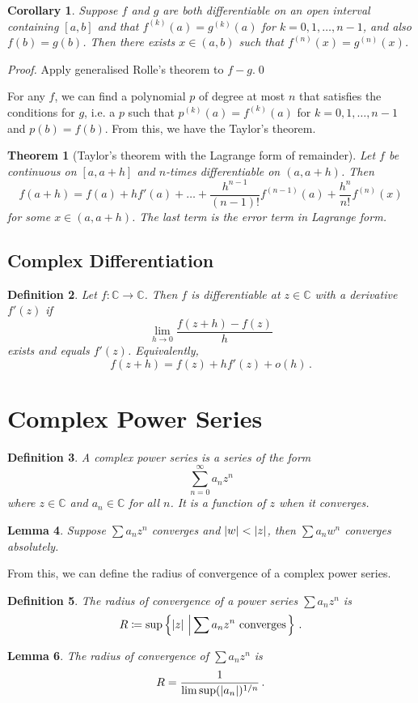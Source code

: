 \documentclass{article}
\theoremstyle{plain}\theoremheaderfont{\normalfont\itshape}\theorembodyfont{\rmfamily}\theoremseparator{.}\newtheorem*{rem}{Remark}\newtheorem*{ex}{Example}\newtheorem*{proof}{Proof}\newtheorem*{altp}{Alternative proof}
\theoremstyle{plain}\theoremheaderfont{\normalfont\bfseries}\theorembodyfont{\rmfamily}\theoremseparator{.}\newtheorem{thm}{Theorem}[section]\newtheorem{lem}[thm]{Lemma}\newtheorem{prop}[thm]{Proposition}\newtheorem*{cor}{Corollary}\newtheorem{defn}[thm]{Definition}\newtheorem{clm}[thm]{Claim}\newtheorem{clminproof}{Claim}
\theoremstyle{break}\theoremheaderfont{\normalfont\itshape}\theorembodyfont{\rmfamily}\theoremseparator{.\medskip}\newtheorem*{proofskip}{Proof}\newtheorem*{exs}{Examples}\newtheorem*{rems}{Remarks}
\theoremstyle{break}\theoremheaderfont{\normalfont\bfseries}\theorembodyfont{\rmfamily}\theoremseparator{.\medskip}\newtheorem{lemskip}[thm]{Lemma}\newtheorem{defnskip}[thm]{Definition}\newtheorem{propskip}[thm]{Proposition}\newtheorem{thmskip}[thm]{Theorem}
\newcommand{\qed}{\hfill\ensuremath{\Box}}
\begin{document}
    \begin{cor}
        Suppose \(f\) and \(g\) are both differentiable on an open interval containing \([a,b]\) and that \(f^{(k)}(a)=g^{(k)}(a)\) for \(k=0,1,\dots,n-1\), and also \(f(b)=g(b)\). Then there exists \(x\in(a,b)\) such that \(f^{(n)}(x)=g^{(n)}(x)\).
    \end{cor}
    \begin{proof}
        Apply generalised Rolle's theorem to \(f-g\).\qed
    \end{proof}
    For any \(f\), we can find a polynomial \(p\) of degree at most \(n\) that satisfies the conditions for \(g\), i.e. a \(p\) such that \(p^{(k)}(a)=f^{(k)}(a)\) for \(k=0,1,\dots,n-1\) and \(p(b)=f(b)\). From this, we have the Taylor's theorem.
    \begin{thm}[Taylor's theorem with the Lagrange form of remainder]
        Let \(f\) be continuous on \([a,a+h]\) and \(n\)-times differentiable on \((a,a+h)\). Then
        \[f(a+h)=f(a)+hf'(a)+\dots+\frac{h^{n-1}}{(n-1)!}f^{(n-1)}(a)+\frac{h^n}{n!}f^{(n)}(x)\]
        for some \(x\in(a,a+h)\). The last term is the error term in Lagrange form.
    \end{thm}
    \subsection{Complex Differentiation}
    \begin{defn}
        Let \(f:\mathbb{C}\to\mathbb{C}\). Then \(f\) is differentiable at \(z\in\mathbb{C}\) with a derivative \(f'(z)\) if
        \[\lim_{h\to 0}\frac{f(z+h)-f(z)}{h}\]
        exists and equals \(f'(z)\). Equivalently,
        \[f(z+h)=f(z)+hf'(z)+o(h)\,.\] 
    \end{defn}
    \section{Complex Power Series}
    \begin{defn}
        A \textit{complex power series} is a series of the form
        \[\sum_{n=0}^{\infty}a_nz^n\]
        where \(z\in\mathbb{C}\) and \(a_n\in\mathbb{C}\) for all \(n\). It is a function of \(z\) when it converges.
    \end{defn}
    \begin{lem}
        Suppose \(\sum a_nz^n\) converges and \(\abs{w}<\abs{z}\), then \(\sum a_n w^n\) converges absolutely.
    \end{lem}
    From this, we can define the radius of convergence of a complex power series.
    \begin{defn}
        The \textit{radius of convergence} of a power series \(\sum a_nz^n\) is
        \[R\coloneqq\sup\left\{\abs{z}\,\left|\,\sum a_nz^n \text{ converges}\right.\right\}\,.\]
    \end{defn}
    \begin{lem}
        The radius of convergence of \(\sum a_nz^n\) is
        \[R=\frac{1}{\limsup(\abs{a_n})^{1/n}}\,.\]
    \end{lem}
\end{document}
